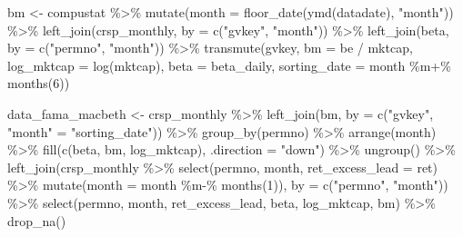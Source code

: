 \documentclass[
]{krantz}
\newenvironment{Shaded}{\begin{snugshade}}{\end{snugshade}}
\newcommand{\AttributeTok}[1]{\textcolor[rgb]{0.61,0.61,0.61}{#1}}
\newcommand{\DecValTok}[1]{\textcolor[rgb]{0.06,0.06,0.06}{#1}}
\newcommand{\FunctionTok}[1]{\textcolor[rgb]{0,0,0}{#1}}
\newcommand{\NormalTok}[1]{#1}
\newcommand{\OtherTok}[1]{\textcolor[rgb]{0.37,0.37,0.37}{#1}}
\newcommand{\SpecialCharTok}[1]{\textcolor[rgb]{0,0,0}{#1}}
\newcommand{\StringTok}[1]{\textcolor[rgb]{0.5,0.5,0.5}{#1}}
\begin{document}
\begin{Shaded}
\begin{Highlighting}[]
\NormalTok{bm }\OtherTok{\textless{}{-}}\NormalTok{ compustat }\SpecialCharTok{\%\textgreater{}\%}
  \FunctionTok{mutate}\NormalTok{(}\AttributeTok{month =} \FunctionTok{floor\_date}\NormalTok{(}\FunctionTok{ymd}\NormalTok{(datadate), }\StringTok{"month"}\NormalTok{)) }\SpecialCharTok{\%\textgreater{}\%}
  \FunctionTok{left\_join}\NormalTok{(crsp\_monthly, }\AttributeTok{by =} \FunctionTok{c}\NormalTok{(}\StringTok{"gvkey"}\NormalTok{, }\StringTok{"month"}\NormalTok{)) }\SpecialCharTok{\%\textgreater{}\%}
  \FunctionTok{left\_join}\NormalTok{(beta, }\AttributeTok{by =} \FunctionTok{c}\NormalTok{(}\StringTok{"permno"}\NormalTok{, }\StringTok{"month"}\NormalTok{)) }\SpecialCharTok{\%\textgreater{}\%}
  \FunctionTok{transmute}\NormalTok{(gvkey,}
            \AttributeTok{bm =}\NormalTok{ be }\SpecialCharTok{/}\NormalTok{ mktcap,}
            \AttributeTok{log\_mktcap =} \FunctionTok{log}\NormalTok{(mktcap),}
            \AttributeTok{beta =}\NormalTok{ beta\_daily,}
            \AttributeTok{sorting\_date =}\NormalTok{ month }\SpecialCharTok{\%m+\%} \FunctionTok{months}\NormalTok{(}\DecValTok{6}\NormalTok{))}

\NormalTok{data\_fama\_macbeth }\OtherTok{\textless{}{-}}\NormalTok{ crsp\_monthly }\SpecialCharTok{\%\textgreater{}\%}
  \FunctionTok{left\_join}\NormalTok{(bm, }\AttributeTok{by =} \FunctionTok{c}\NormalTok{(}\StringTok{"gvkey"}\NormalTok{, }\StringTok{"month"} \OtherTok{=} \StringTok{"sorting\_date"}\NormalTok{)) }\SpecialCharTok{\%\textgreater{}\%}
  \FunctionTok{group\_by}\NormalTok{(permno) }\SpecialCharTok{\%\textgreater{}\%}
  \FunctionTok{arrange}\NormalTok{(month) }\SpecialCharTok{\%\textgreater{}\%}
  \FunctionTok{fill}\NormalTok{(}\FunctionTok{c}\NormalTok{(beta, bm, log\_mktcap), }\AttributeTok{.direction =} \StringTok{"down"}\NormalTok{) }\SpecialCharTok{\%\textgreater{}\%}
  \FunctionTok{ungroup}\NormalTok{() }\SpecialCharTok{\%\textgreater{}\%}
  \FunctionTok{left\_join}\NormalTok{(crsp\_monthly }\SpecialCharTok{\%\textgreater{}\%}
              \FunctionTok{select}\NormalTok{(permno, month, }\AttributeTok{ret\_excess\_lead =}\NormalTok{ ret) }\SpecialCharTok{\%\textgreater{}\%}
              \FunctionTok{mutate}\NormalTok{(}\AttributeTok{month =}\NormalTok{ month }\SpecialCharTok{\%m{-}\%} \FunctionTok{months}\NormalTok{(}\DecValTok{1}\NormalTok{)),}
            \AttributeTok{by =} \FunctionTok{c}\NormalTok{(}\StringTok{"permno"}\NormalTok{, }\StringTok{"month"}\NormalTok{)) }\SpecialCharTok{\%\textgreater{}\%}
  \FunctionTok{select}\NormalTok{(permno, month, ret\_excess\_lead, beta, log\_mktcap, bm) }\SpecialCharTok{\%\textgreater{}\%}
  \FunctionTok{drop\_na}\NormalTok{()}
\end{Highlighting}
\end{Shaded}
\end{document}
